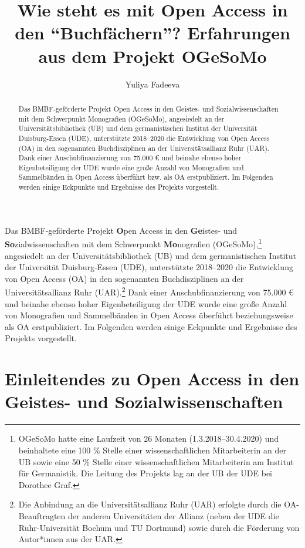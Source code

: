 \documentclass[a4paper,
fontsize=11pt,
oneside,
numbers=noperiodatend,
parskip=half-,
bibliography=totoc,
final
]{scrartcl}
\title{\LARGE{Wie steht es mit Open Access in den \enquote{Buchfächern}? Erfahrungen aus dem Projekt OGeSoMo}}%
\author{Yuliya Fadeeva} %
\date{}
\begin{document}
\maketitle
\thispagestyle{fancyplain} 

\begin{abstract}
\noindent
Das BMBF-geförderte Projekt Open Access in den Geistes- und
Sozialwissenschaften mit dem Schwerpunkt Monografien (OGeSoMo),
angesiedelt an der Universitätsbibliothek (UB) und dem germanistischen
Institut der Universität Duisburg-Essen (UDE), unterstützte 2018--2020
die Entwicklung von Open Access (OA) in den sogenannten Buchdisziplinen
an der Universitätsallianz Ruhr (UAR). Dank einer Anschubfinanzierung
von 75.000 € und beinahe ebenso hoher Eigenbeteiligung der UDE wurde
eine große Anzahl von Monografien und Sammelbänden in Open Access
überführt bzw. als OA erstpubliziert. Im Folgenden werden einige
Eckpunkte und Ergebnisse des Projekts vorgestellt.
\end{abstract}

Das BMBF-geförderte Projekt \textbf{O}pen Access in den
\textbf{Ge}istes- und \textbf{So}zialwissenschaften mit dem Schwerpunkt
\textbf{Mo}nografien (OGeSoMo),\footnote{OGeSoMo hatte eine Laufzeit von
  26 Monaten (1.3.2018--30.4.2020) und beinhaltete eine 100 \% Stelle
  einer wissenschaftlichen Mitarbeiterin an der UB sowie eine 50 \%
  Stelle einer wissenschaftlichen Mitarbeiterin am Institut für
  Germanistik. Die Leitung des Projekts lag an der UB der UDE bei
  Dorothee Graf.} angesiedelt an der Universitätsbibliothek (UB) und dem
germanistischen Institut der Universität Duisburg-Essen (UDE),
unterstützte 2018--2020 die Entwicklung von Open Access (OA) in den
sogenannten Buchdisziplinen an der Universitätsallianz Ruhr
(UAR).\footnote{Die Anbindung an die Universitätsallianz Ruhr (UAR)
  erfolgte durch die OA-Beauftragten der anderen Universitäten der
  Allianz (neben der UDE die Ruhr-Universität Bochum und TU Dortmund)
  sowie durch die Förderung von Autor*innen aus der UAR.} Dank einer
Anschubfinanzierung von 75.000 € und beinahe ebenso hoher
Eigenbeteiligung der UDE wurde eine große Anzahl von Monografien und
Sammelbänden in Open Access überführt beziehungsweise als OA
erstpubliziert. Im Folgenden werden einige Eckpunkte und Ergebnisse des
Projekts vorgestellt.

\hypertarget{einleitendes-zu-open-access-in-den-geistes--und-sozialwissenschaften}{%
\section{Einleitendes zu Open Access in den Geistes- und
Sozialwissenschaften}\label{einleitendes-zu-open-access-in-den-geistes--und-sozialwissenschaften}}
\end{document}
